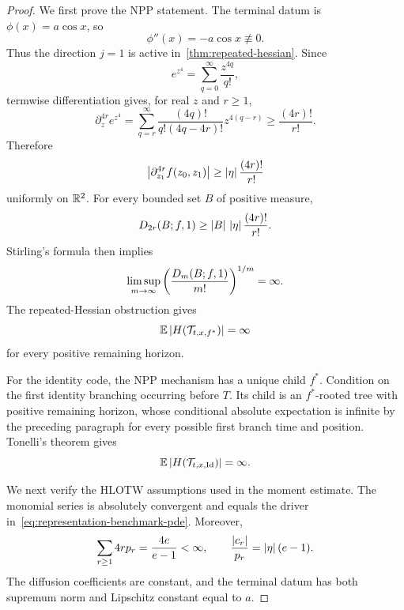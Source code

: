 \begin{proof}
We first prove the NPP statement. The terminal datum is $\phi(x)=a\cos x$, so
\begin{equation*}
  \phi''(x)=-a\cos x\not\equiv0.
\end{equation*}
Thus the direction $j=1$ is active in~\cref{thm:repeated-hessian}. Since
\begin{equation*}
  e^{z^4}
  =
  \sum_{q=0}^\infty\frac{z^{4q}}{q!},
\end{equation*}
termwise differentiation gives, for real $z$ and $r\geq1$,
\begin{equation*}
  \partial_z^{4r}e^{z^4}
  =
  \sum_{q=r}^\infty
  \frac{(4q)!}{q!(4q-4r)!}z^{4(q-r)}
  \geq
  \frac{(4r)!}{r!}.
\end{equation*}
Therefore
\begin{equation}
  \left|\partial_{z_1}^{4r}f(z_0,z_1)\right|
  \geq
  \left|\eta\right|\frac{(4r)!}{r!}
  \label{eq:dichotomy-jet-lower}
\end{equation}
uniformly on $\mathbb R^2$. For every bounded set $B$ of positive measure,
\begin{equation*}
  D_{2r}(B;f,1)
  \geq
  \left|B\right|\,\left|\eta\right|\frac{(4r)!}{r!}.
\end{equation*}
Stirling's formula then implies
\begin{equation*}
  \limsup_{m\to\infty}
  \left(\frac{D_m(B;f,1)}{m!}\right)^{1/m}
  =\infty.
\end{equation*}
The repeated-Hessian obstruction gives
\begin{equation*}
  \mathbb E\left|H(\mathcal T_{t,x,f^*})\right|
  =\infty
\end{equation*}
for every positive remaining horizon.

For the identity code, the NPP mechanism has a unique child $f^*$. Condition on the first identity branching occurring before $T$. Its child is an $f^*$-rooted tree with positive remaining horizon, whose conditional absolute expectation is infinite by the preceding paragraph for every possible first branch time and position. Tonelli's theorem gives
\begin{equation*}
  \mathbb E\left|H(\mathcal T_{t,x,\operatorname{Id}})\right|
  =\infty.
\end{equation*}

We next verify the HLOTW assumptions used in the moment estimate. The monomial series is absolutely convergent and equals the driver in~\eqref{eq:representation-benchmark-pde}. Moreover,
\begin{equation}
  \sum_{r\geq1}4rp_r
  =
  \frac{4e}{e-1}<\infty,
  \qquad
  \frac{\left|c_r\right|}{p_r}
  =
  \left|\eta\right|(e-1).
  \label{eq:HLOTW-offspring-check}
\end{equation}
The diffusion coefficients are constant, and the terminal datum has both supremum norm and Lipschitz constant equal to $a$.


\end{proof}
